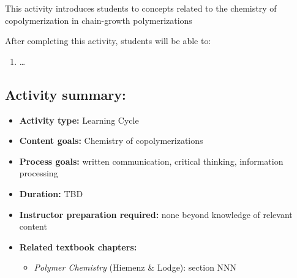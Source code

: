 %
%
%
%

\renewcommand{\figpath}{content/polymchem/copolymers/copolym/figs}
\renewcommand{\labelbase}{copolym}

\begin{activity}[Copolymerization]

\begin{instructornotes}
	This activity introduces students to concepts related to the chemistry of copolymerization in chain-growth polymerizations
	
	After completing this activity, students will be able to:
	\begin{enumerate}
		\item \dots
	\end{enumerate}
	
	\subsection*{Activity summary:}
	\begin{itemize}
		\item \textbf{Activity type:} Learning Cycle
		\item \textbf{Content goals:} Chemistry of copolymerizations
		\item \textbf{Process goals:} %
			written communication, critical thinking, information processing
		\item \textbf{Duration:} TBD
		\item \textbf{Instructor preparation required:} none beyond knowledge of relevant content
		\item \textbf{Related textbook chapters:}
			\begin{itemize}
				\item \emph{Polymer Chemistry} (Hiemenz \& Lodge): section NNN
			\end{itemize}
	\end{itemize}
	

\end{instructornotes}
\end{activity}
